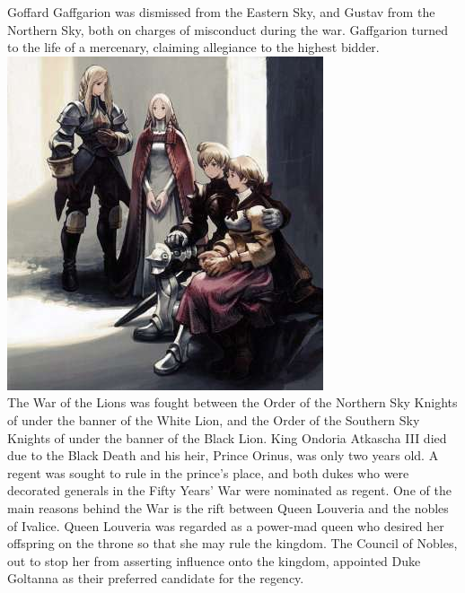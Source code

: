 Goffard Gaffgarion was dismissed from the Eastern Sky, and Gustav from the Northern Sky, both on charges of misconduct during the war. 
Gaffgarion turned to the life of a mercenary, claiming allegiance to the highest bidder.
%
\vfill
\includegraphics[width=\columnwidth]{./art/worldbook/belouve.jpg}
%
\clearpage
%
\\
The War of the Lions was fought between the Order of the Northern Sky Knights of  under the banner of the White Lion, and the Order of the Southern Sky Knights of  under the banner of the Black Lion. 
King Ondoria Atkascha III died due to the Black Death and his heir, Prince Orinus, was only two years old. 
A regent was sought to rule in the prince's place, and both dukes who were decorated generals in the Fifty Years' War were nominated as regent.
One of the main reasons behind the War is the rift between Queen Louveria and the nobles of Ivalice. 
Queen Louveria was regarded as a power-mad queen who desired her offspring on the throne so that she may rule the kingdom. 
The Council of Nobles, out to stop her from asserting influence onto the kingdom, appointed Duke Goltanna as their preferred candidate for the regency.
%
\ofpar
